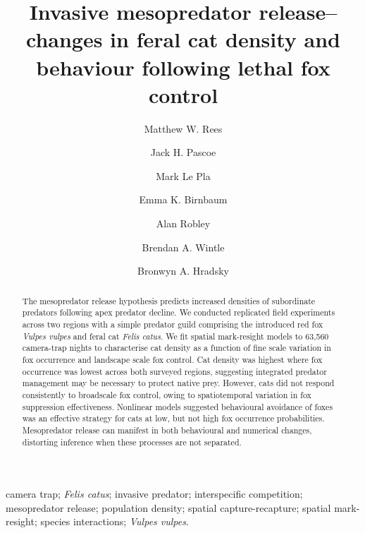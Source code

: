 \documentclass[]{elsarticle} %
\begin{document}
\begin{frontmatter}

  \title{Invasive mesopredator release--changes in feral cat density and behaviour following lethal fox control}
    \author[UOM]{Matthew W. Rees}
    \author[CEC]{Jack H. Pascoe}
  
    \author[CEC]{Mark Le Pla}
  
    \author[CEC]{Emma K. Birnbaum}
  
    \author[ARI]{Alan Robley}
  
    \author[UOM]{Brendan A. Wintle}
  
    \author[UOM]{Bronwyn A. Hradsky}
  
      \address[UOM]{Quantitative \& Applied Ecology Group, School of Ecosystem and Forest Science, The University of Melbourne, Parkville, VIC, Australia}
    \address[CEC]{Conservation Ecology Centre, Otway Lighthouse Rd, Cape Otway, VIC, Australia}
    \address[ARI]{Department of Environment, Land, Water and Planning, Arthur Rylah Institute for Environmental Research, Heidelberg, Australia}
  
  \begin{abstract}
  The mesopredator release hypothesis predicts increased densities of subordinate predators following apex predator decline. We conducted replicated field experiments across two regions with a simple predator guild comprising the introduced red fox \emph{Vulpes vulpes} and feral cat \emph{Felis catus}. We fit spatial mark-resight models to 63,560 camera-trap nights to characterise cat density as a function of fine scale variation in fox occurrence and landscape scale fox control. Cat density was highest where fox occurrence was lowest across both surveyed regions, suggesting integrated predator management may be necessary to protect native prey. However, cats did not respond consistently to broadscale fox control, owing to spatiotemporal variation in fox suppression effectiveness. Nonlinear models suggested behavioural avoidance of foxes was an effective strategy for cats at low, but not high fox occurrence probabilities. Mesopredator release can manifest in both behavioural and numerical changes, distorting inference when these processes are not separated.
  \end{abstract}
   \begin{keyword} camera trap; \emph{Felis catus}; invasive predator; interspecific competition; mesopredator release; population density; spatial capture-recapture; spatial mark-resight; species interactions; \emph{Vulpes vulpes}.\end{keyword}
 \end{frontmatter}
\end{document}
